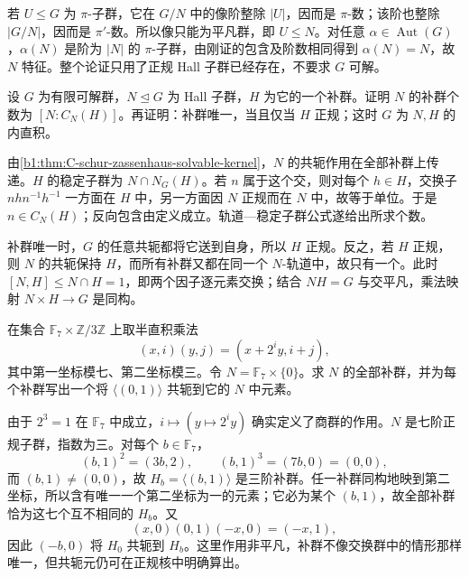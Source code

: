 \begin{solution}
	若 \(U\leq G\) 为 \(\pi\)-子群，它在 \(G/N\) 中的像阶整除 \(|U|\)，因而是 \(\pi\)-数；该阶也整除 \(|G/N|\)，因而是 \(\pi'\)-数。所以像只能为平凡群，即 \(U\leq N\)。对任意 \(\alpha\in\operatorname{Aut}(G)\)，\(\alpha(N)\) 是阶为 \(|N|\) 的 \(\pi\)-子群，由刚证的包含及阶数相同得到 \(\alpha(N)=N\)，故 \(N\) 特征。整个论证只用了正规 Hall 子群已经存在，不要求 \(G\) 可解。
\end{solution}

\begin{exercise}\label{b1:ex:C-complement-count}
	设 \(G\) 为有限可解群，\(N\trianglelefteq G\) 为 Hall 子群，\(H\) 为它的一个补群。证明 \(N\) 的补群个数为 \([N:C_N(H)]\)。再证明：补群唯一，当且仅当 \(H\) 正规；这时 \(G\) 为 \(N,H\) 的内直积。
\end{exercise}

\begin{solution}
	由\cref{b1:thm:C-schur-zassenhaus-solvable-kernel}，\(N\) 的共轭作用在全部补群上传递。\(H\) 的稳定子群为 \(N\cap N_G(H)\)。若 \(n\) 属于这个交，则对每个 \(h\in H\)，交换子 \(nhn^{-1}h^{-1}\) 一方面在 \(H\) 中，另一方面因 \(N\) 正规而在 \(N\) 中，故等于单位。于是 \(n\in C_N(H)\)；反向包含由定义成立。轨道—稳定子群公式遂给出所求个数。

	补群唯一时，\(G\) 的任意共轭都将它送到自身，所以 \(H\) 正规。反之，若 \(H\) 正规，则 \(N\) 的共轭保持 \(H\)，而所有补群又都在同一个 \(N\)-轨道中，故只有一个。此时 \([N,H]\leq N\cap H=1\)，即两个因子逐元素交换；结合 \(NH=G\) 与交平凡，乘法映射 \(N\times H\rightarrow G\) 是同构。
\end{solution}

\begin{exercise}\label{b1:ex:C-affine-complements}
	在集合 \(\mathbb F_7\times\mathbb Z/3\mathbb Z\) 上取半直积乘法
	\[
		(x,i)(y,j)=(x+2^i y,i+j),
	\]
	其中第一坐标模七、第二坐标模三。令 \(N=\mathbb F_7\times\{0\}\)。求 \(N\) 的全部补群，并为每个补群写出一个将 \(\langle(0,1)\rangle\) 共轭到它的 \(N\) 中元素。
\end{exercise}

\begin{solution}
	由于 \(2^3=1\) 在 \(\mathbb F_7\) 中成立，\(i\mapsto(y\mapsto2^i y)\) 确实定义了商群的作用。\(N\) 是七阶正规子群，指数为三。对每个 \(b\in\mathbb F_7\)，
	\[
		(b,1)^2=(3b,2),\qquad (b,1)^3=(7b,0)=(0,0),
	\]
	而 \((b,1)\ne(0,0)\)，故 \(H_b=\langle(b,1)\rangle\) 是三阶补群。任一补群同构地映到第二坐标，所以含有唯一一个第二坐标为一的元素；它必为某个 \((b,1)\)，故全部补群恰为这七个互不相同的 \(H_b\)。又
	\[
		(x,0)(0,1)(-x,0)=(-x,1),
	\]
	因此 \((-b,0)\) 将 \(H_0\) 共轭到 \(H_b\)。这里作用非平凡，补群不像交换群中的情形那样唯一，但共轭元仍可在正规核中明确算出。
\end{solution}

